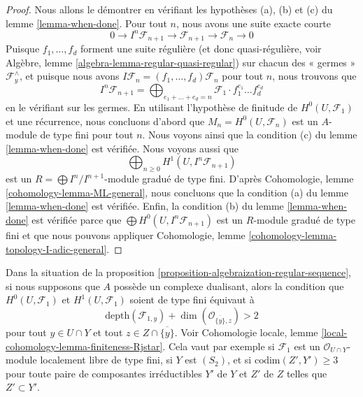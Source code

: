 \begin{proof}
Nous allons le démontrer en vérifiant les hypothèses (a), (b) et (c) du
lemme \ref{lemma-when-done}.
Pour tout $n$, nous avons une suite exacte courte
$$
0 \to I^n\mathcal{F}_{n + 1} \to \mathcal{F}_{n + 1} \to \mathcal{F}_n \to 0
$$
Puisque $f_1, \ldots, f_d$ forment une suite régulière (et donc
quasi-régulière, voir Algèbre, lemme \ref{algebra-lemma-regular-quasi-regular})
sur chacun des « germes » $\mathcal{F}_y^\wedge$, et puisque nous avons
$I\mathcal{F}_n = (f_1, \ldots, f_d)\mathcal{F}_n$ pour tout $n$,
nous trouvons que
$$
I^n\mathcal{F}_{n + 1} =
\bigoplus\nolimits_{e_1 + \ldots + e_d = n} \mathcal{F}_1 \cdot
f_1^{e_1} \ldots f_d^{e_d}
$$
en le vérifiant sur les germes. En utilisant l'hypothèse de finitude de
$H^0(U, \mathcal{F}_1)$ et une récurrence, nous concluons d'abord que
$M_n = H^0(U, \mathcal{F}_n)$ est un $A$-module de type fini pour tout $n$.
Nous voyons ainsi que la condition (c) du lemme \ref{lemma-when-done} est vérifiée.
Nous voyons aussi que
$$
\bigoplus\nolimits_{n \geq 0} H^1(U, I^n\mathcal{F}_{n + 1})
$$
est un $R = \bigoplus I^n/I^{n +1}$-module gradué de type fini.
D'après Cohomologie, lemme \ref{cohomology-lemma-ML-general},
nous concluons que la condition (a) du
lemme \ref{lemma-when-done} est vérifiée. Enfin, la condition (b) du
lemme \ref{lemma-when-done} est vérifiée parce que
$\bigoplus H^0(U, I^n\mathcal{F}_{n + 1})$ est un $R$-module gradué de type fini
et que nous pouvons appliquer
Cohomologie, lemme \ref{cohomology-lemma-topology-I-adic-general}.
\end{proof}

\begin{remark}
\label{remark-interesting-case-ter}
Dans la situation de la
proposition \ref{proposition-algebraization-regular-sequence},
si nous supposons que $A$ possède un complexe dualisant, alors
la condition que $H^0(U, \mathcal{F}_1)$ et
$H^1(U, \mathcal{F}_1)$ soient de type fini équivaut à
$$
\text{depth}(\mathcal{F}_{1, y}) +
\dim(\mathcal{O}_{\overline{\{y\}}, z}) > 2
$$
pour tout $y \in U \cap Y$ et tout $z \in Z \cap \overline{\{y\}}$.
Voir Cohomologie locale, lemme \ref{local-cohomology-lemma-finiteness-Rjstar}.
Cela vaut par exemple si $\mathcal{F}_1$ est un
$\mathcal{O}_{U \cap Y}$-module localement libre de type fini, si $Y$ est $(S_2)$, et si
$\text{codim}(Z', Y') \geq 3$ pour toute paire de composantes irréductibles
$Y'$ de $Y$ et $Z'$ de $Z$ telles que $Z' \subset Y'$.
\end{remark}

